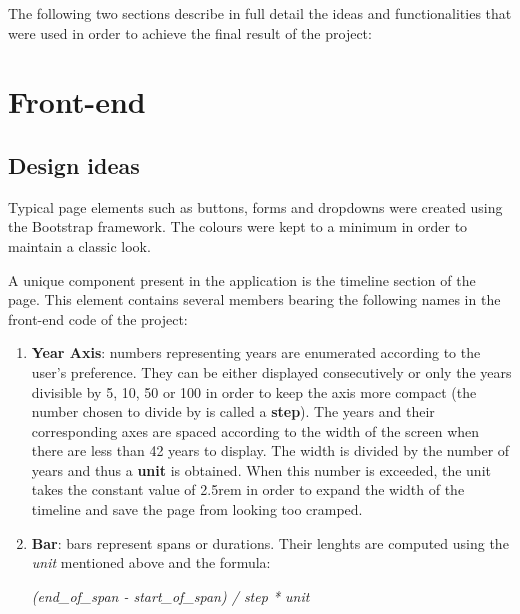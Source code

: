 \documentclass{report}
\begin{document}
The following two sections describe in full detail the ideas and functionalities that were used in order to achieve the final result of the project:

\section {Front-end}
\subsection {Design ideas}
Typical page elements such as buttons, forms and dropdowns were created using the Bootstrap framework. The colours were kept to a minimum in order to maintain a classic look. \par
A unique component present in the application is the timeline section of the page. This element contains several members bearing the following names in the front-end code of the project:
\begin{enumerate}
  \item \textbf{Year Axis}: numbers representing years are enumerated according to the user's preference. They can be either displayed consecutively or only the years divisible by 5, 10, 50 or 100 in order to keep the axis more compact (the number chosen to divide by is called a \textbf{step}). The years and their corresponding axes are spaced according to the width of the screen when there are less than 42 years to display. The width is divided by the number of years and thus a \textbf{unit} is obtained. When this number is exceeded, the unit takes the constant value of 2.5rem in order to expand the width of the timeline and save the page from looking too cramped. 
  \item \textbf{Bar}: bars represent spans or durations. Their lenghts are computed using the \textit{unit} mentioned above and the formula:\\\centerline{\textit{(end\_of\_span - start\_of\_span) / step * unit}}
\end{enumerate}
\end{document}
